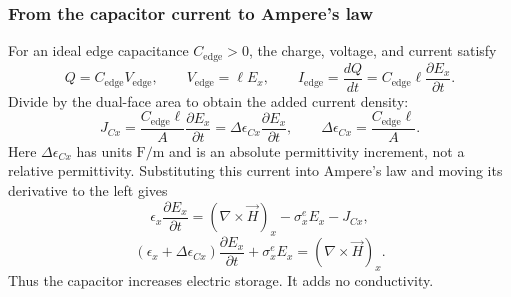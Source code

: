 \documentclass[10pt]{article}
\begin{document}
\subsubsection{From the capacitor current to Ampere's law}
For an ideal edge capacitance $C_{\mathrm{edge}}>0$, the charge, voltage,
and current satisfy
\begin{equation}
    Q=C_{\mathrm{edge}}V_{\mathrm{edge}},\qquad
    V_{\mathrm{edge}}=\ell E_x,\qquad
    I_{\mathrm{edge}}=\frac{dQ}{dt}
        =C_{\mathrm{edge}}\ell\frac{\partial E_x}{\partial t}.
\end{equation}
Divide by the dual-face area to obtain the added current density:
\begin{equation}
    \boxed{J_{Cx}=\frac{C_{\mathrm{edge}}\ell}{A}
                    \frac{\partial E_x}{\partial t}
        =\Delta\epsilon_{Cx}\frac{\partial E_x}{\partial t},\qquad
        \Delta\epsilon_{Cx}=\frac{C_{\mathrm{edge}}\ell}{A}.}
    \label{eq:capacitor-current}
\end{equation}
Here $\Delta\epsilon_{Cx}$ has units $\mathrm{F/m}$ and is an absolute
permittivity increment, not a relative permittivity. Substituting this
current into Ampere's law and moving its derivative to the left gives
\begin{equation}
    \epsilon_x\frac{\partial E_x}{\partial t}
        =(\nabla\times\vec H)_x-\sigma_x^e E_x-J_{Cx},
\end{equation}
\begin{equation}
    \boxed{(\epsilon_x+\Delta\epsilon_{Cx})
        \frac{\partial E_x}{\partial t}
        +\sigma_x^e E_x=(\nabla\times\vec H)_x.}
    \label{eq:capacitor-maxwell}
\end{equation}
Thus the capacitor increases electric storage. It adds no conductivity.
\end{document}
